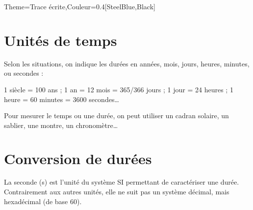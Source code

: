 \begin{Maquette}[Cours]{Theme={Trace écrite},Couleur={0.4[SteelBlue,Black]}}

   \section{Unités de temps}

      Selon les situations, on indique les durées en années, mois, jours, heures, minutes, ou secondes : \par
      1 siècle = 100 ans ; 1 an = 12 mois = 365/366 jours ; 1 jour = 24 heures ; 1 heure = 60 minutes = \num{3600} secondes\dots \par
      Pour mesurer le temps ou une durée, on peut utiliser un cadran solaire, un sablier, une montre, un chronomètre\dots

   \section{Conversion de durées}

      La seconde (s) est l'unité du système SI permettant de caractériser une durée. Contrairement aux autres unités, elle ne suit pas un système décimal, mais hexadécimal (de base 60).


\end{Maquette}
